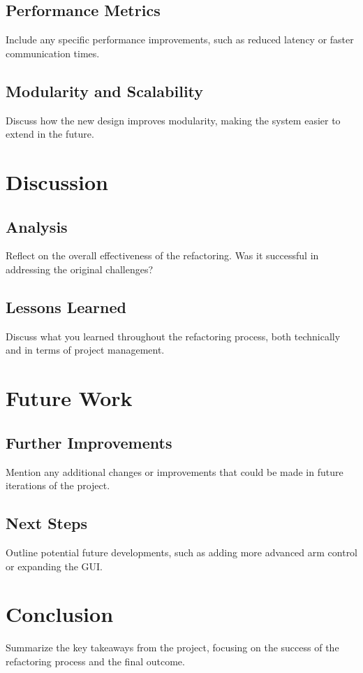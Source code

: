 \documentclass[twocolumn]{article}
\begin{document}
\subsection{Performance Metrics}
Include any specific performance improvements, such as reduced latency or faster communication times.

\subsection{Modularity and Scalability}
Discuss how the new design improves modularity, making the system easier to extend in the future.

\section{Discussion}
\subsection{Analysis}
Reflect on the overall effectiveness of the refactoring. Was it successful in addressing the original challenges?

\subsection{Lessons Learned}
Discuss what you learned throughout the refactoring process, both technically and in terms of project management.

\section{Future Work}
\subsection{Further Improvements}
Mention any additional changes or improvements that could be made in future iterations of the project.

\subsection{Next Steps}
Outline potential future developments, such as adding more advanced arm control or expanding the GUI.

\section{Conclusion}
Summarize the key takeaways from the project, focusing on the success of the refactoring process and the final outcome.
\end{document}
